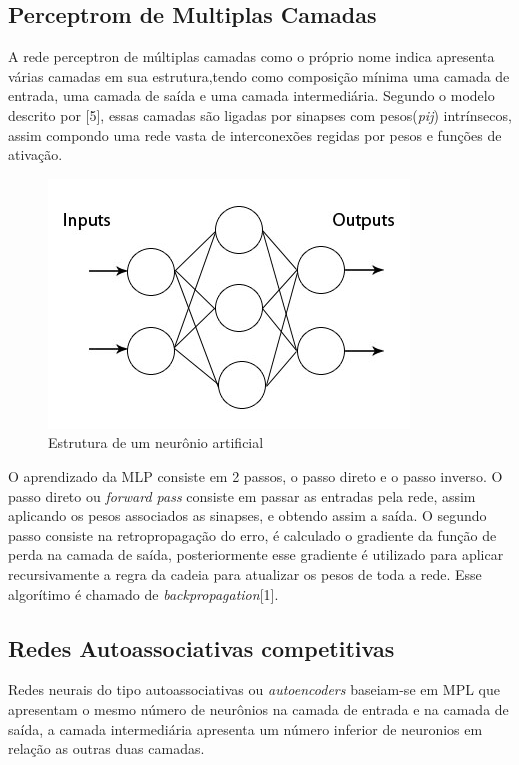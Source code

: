 \subsection{Perceptrom de Multiplas Camadas}
A rede perceptron de múltiplas camadas como o próprio nome indica apresenta várias camadas em sua estrutura,tendo como composição mínima uma camada de entrada, uma camada de saída e uma camada intermediária. Segundo o modelo descrito por [5], essas camadas são ligadas por sinapses com pesos(\textit{pij}) intrínsecos, assim compondo uma rede vasta de interconexões regidas por pesos e funções de ativação.
\begin{figure}[H]

\centering %
\includegraphics[width=\columnwidth]{04-Figuras/MLP_estrurura}
\caption{Estrutura de um neurônio artificial}

\label{figura:Arquitetura de uma rede MLP}

\end{figure}

O aprendizado da MLP consiste em 2 passos, o passo direto e o passo inverso. O passo direto ou \textit{forward pass} consiste em passar as entradas pela rede, assim aplicando os pesos associados as sinapses, e obtendo assim a saída. O segundo passo consiste na retropropagação do erro, é calculado o gradiente da função de perda na camada de saída, posteriormente esse gradiente é utilizado para aplicar recursivamente a regra da cadeia para atualizar os pesos de toda a rede.
Esse algorítimo é chamado de \textit{backpropagation}[1].

\subsection{Redes Autoassociativas competitivas}
Redes neurais do tipo autoassociativas ou \textit{autoencoders} baseiam-se em MPL que apresentam o mesmo número de neurônios na camada de entrada e na camada de saída, a camada intermediária apresenta um número inferior de neuronios em relação as outras duas camadas. 

